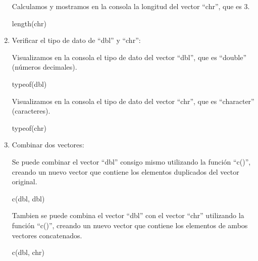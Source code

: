 \documentclass[
  letterpaper,
  DIV=11,
  numbers=noendperiod]{scrartcl}
\newenvironment{Shaded}{}{}
\newcommand{\FunctionTok}[1]{\textcolor[rgb]{0.44,0.26,0.76}{#1}}
\newcommand{\NormalTok}[1]{\textcolor[rgb]{0.14,0.16,0.18}{#1}}
\begin{document}
\begin{enumerate}
  Calculamos y mostramos en la consola la longitud del vector ``chr'',
  que es 3.

\begin{Shaded}
\begin{Highlighting}[]
\FunctionTok{length}\NormalTok{(chr)}
\end{Highlighting}
\end{Shaded}
\item
  Verificar el tipo de dato de ``dbl'' y ``chr'':

  Visualizamos en la consola el tipo de dato del vector ``dbl'', que es
  ``double'' (números decimales).

\begin{Shaded}
\begin{Highlighting}[]
\FunctionTok{typeof}\NormalTok{(dbl)}
\end{Highlighting}
\end{Shaded}

  Visualizamos en la consola el tipo de dato del vector ``chr'', que es
  ``character'' (caracteres).

\begin{Shaded}
\begin{Highlighting}[]
\FunctionTok{typeof}\NormalTok{(chr)}
\end{Highlighting}
\end{Shaded}
\item
  Combinar dos vectores:

  Se puede combinar el vector ``dbl'' consigo mismo utilizando la
  función ``c()'', creando un nuevo vector que contiene los elementos
  duplicados del vector original.

\begin{Shaded}
\begin{Highlighting}[]
\FunctionTok{c}\NormalTok{(dbl, dbl)}
\end{Highlighting}
\end{Shaded}

  Tambien se puede combina el vector ``dbl'' con el vector ``chr''
  utilizando la función ``c()'', creando un nuevo vector que contiene
  los elementos de ambos vectores concatenados.

\begin{Shaded}
\begin{Highlighting}[]
\FunctionTok{c}\NormalTok{(dbl, chr)}
\end{Highlighting}
\end{Shaded}
\end{enumerate}
\end{document}
